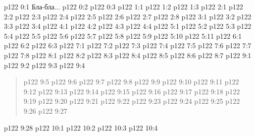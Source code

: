 \author{Промежуточные создания}
\vs p122 0:1  Бла-бла...
\vs p122 0:2 
\vs p122 0:3 
\vs p122 1:1 
\vs p122 1:2 
\vs p122 1:3 
\vs p122 2:1 
\vs p122 2:2 \pc 
\vs p122 2:3 
\vs p122 2:4 
\vs p122 2:5 \pc 
\vs p122 2:6 
\vs p122 2:7 \pc 
\vs p122 2:8 
\vs p122 3:1 
\vs p122 3:2 \pc 
\vs p122 3:3 
\vs p122 3:4 \pc 
{}
\vs p122 4:1 
\vs p122 4:2 \pc 
\vs p122 4:3 
\vs p122 4:4 
\vs p122 5:1 
\vs p122 5:2 
\vs p122 5:3 
\vs p122 5:4 
\vs p122 5:5 
\vs p122 5:6 
\vs p122 5:7 
\vs p122 5:8 \pc 
\vs p122 5:9 
\vs p122 5:10 \pc 
\vs p122 5:11 
\vs p122 6:1 
\vs p122 6:2 
\vs p122 6:3 
\vs p122 7:1 
\vs p122 7:2 
\vs p122 7:3 
\vs p122 7:4 
\vs p122 7:5 
\vs p122 7:6 
\vs p122 7:7 
\vs p122 7:8 
\vs p122 8:1 
\vs p122 8:2 
\vs p122 8:3 
\vs p122 8:4 
\vs p122 8:5 \pc 
\vs p122 8:6 
\vs p122 8:7 
\vs p122 9:1 
\vs p122 9:2 \pc 
\vs p122 9:3 
\vs p122 9:4 
\begin{quote}
\vs p122 9:5 
\vs p122 9:6 
\vs p122 9:7 
\vs p122 9:8 
\vs p122 9:9 
\vs p122 9:10 
\vs p122 9:11 
\vs p122 9:12 
\vs p122 9:13 
\vs p122 9:14 
\vs p122 9:15 
\vs p122 9:16 
\vs p122 9:17 
\vs p122 9:18 
\vs p122 9:19 
\vs p122 9:20 
\vs p122 9:21 
\vs p122 9:22 
\vs p122 9:23 
\vs p122 9:24 
\vs p122 9:25 
\vs p122 9:26 
\vs p122 9:27 
\end{quote}
\vs p122 9:28 \pc 
{}
\vs p122 10:1 
\vs p122 10:2 
\vs p122 10:3 
\vs p122 10:4 
\quizlink
